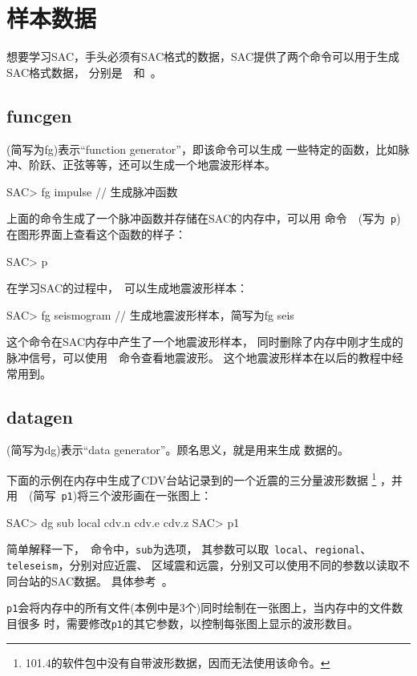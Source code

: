 \section{样本数据}
想要学习SAC，手头必须有SAC格式的数据，SAC提供了两个命令可以用于生成SAC格式数据，
分别是~~和~。

\subsection{funcgen}
(简写为fg)表示``function generator''，即该命令可以生成
一些特定的函数，比如脉冲、阶跃、正弦等等，还可以生成一个地震波形样本。
\begin{SACCode}
SAC> fg impulse         // 生成脉冲函数
\end{SACCode}
上面的命令生成了一个脉冲函数并存储在SAC的内存中，可以用
命令~~(写为~\verb+p+)在图形界面上查看这个函数的样子：
\begin{SACCode}
SAC> p
\end{SACCode}

在学习SAC的过程中，~可以生成地震波形样本：
\begin{SACCode}
SAC> fg seismogram      // 生成地震波形样本，简写为fg seis
\end{SACCode}
这个命令在SAC内存中产生了一个地震波形样本，
同时删除了内存中刚才生成的脉冲信号，可以使用~~命令查看地震波形。
这个地震波形样本在以后的教程中经常用到。

\subsection{datagen}
(简写为dg)表示``data generator''。顾名思义，就是用来生成
数据的。

下面的示例在内存中生成了CDV台站记录到的一个近震的三分量波形数据
\footnote{101.4的软件包中没有自带波形数据，因而无法使用该命令。}
，并用~~(简写~\verb+p1+)将三个波形画在一张图上：
\begin{SACCode}
SAC> dg sub local cdv.n cdv.e cdv.z
SAC> p1
\end{SACCode}
简单解释一下，~命令中，\verb+sub+为选项，
其参数可以取~\verb+local+、\verb+regional+、\verb+teleseism+，分别对应近震、
区域震和远震，分别又可以使用不同的参数以读取不同台站的SAC数据。
具体参考~。

\verb+p1+会将内存中的所有文件(本例中是3个)同时绘制在一张图上，当内存中的文件数目很多
时，需要修改\verb+p1+的其它参数，以控制每张图上显示的波形数目。
